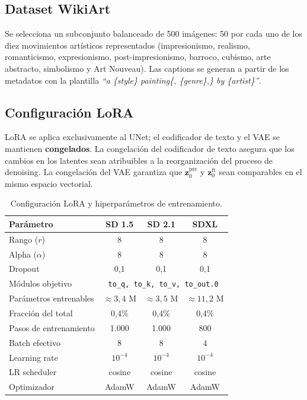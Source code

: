 \documentclass[12pt, a4paper, twoside]{book}
\newcommand{\z}{\mathbf{z}}
\begin{document}
\subsection{Dataset WikiArt}

Se selecciona un subconjunto balanceado de 500 imágenes: 50 por cada uno de los diez movimientos artísticos representados (impresionismo, realismo, romanticismo, expresionismo, post-impresionismo, barroco, cubismo, arte abstracto, simbolismo y Art Nouveau). Las captions se generan a partir de los metadatos con la plantilla \textit{``a \{style\} painting\{, \{genre\},\} by \{artist\}''}.

\subsection{Configuración LoRA}

LoRA se aplica exclusivamente al UNet; el codificador de texto y el VAE se mantienen \textbf{congelados}. La congelación del codificador de texto asegura que los cambios en los latentes sean atribuibles a la reorganización del proceso de denoising. La congelación del VAE garantiza que $\z_0^\text{pre}$ y $\z_0^\text{ft}$ sean comparables en el mismo espacio vectorial.

\begin{table}[htb]
\centering
\caption{Configuración LoRA y hiperparámetros de entrenamiento.}
\label{tab:lora}
\small
\begin{tabular}{lccc}
\toprule
\textbf{Parámetro} & \textbf{SD 1.5} & \textbf{SD 2.1} & \textbf{SDXL} \\
\midrule
Rango ($r$) & 8 & 8 & 8 \\
Alpha ($\alpha$) & 8 & 8 & 8 \\
Dropout & 0,1 & 0,1 & 0,1 \\
Módulos objetivo & \multicolumn{3}{c}{\texttt{to\_q, to\_k, to\_v, to\_out.0}} \\
Parámetros entrenables & $\approx 3{,}4$ M & $\approx 3{,}5$ M & $\approx 11{,}2$ M \\
Fracción del total & 0,4\% & 0,4\% & 0,4\% \\
Pasos de entrenamiento & 1.000 & 1.000 & 800 \\
Batch efectivo & 8 & 8 & 4 \\
Learning rate & $10^{-4}$ & $10^{-4}$ & $10^{-4}$ \\
LR scheduler & cosine & cosine & cosine \\
Optimizador & AdamW & AdamW & AdamW \\
\bottomrule
\end{tabular}
\end{table}
\end{document}
